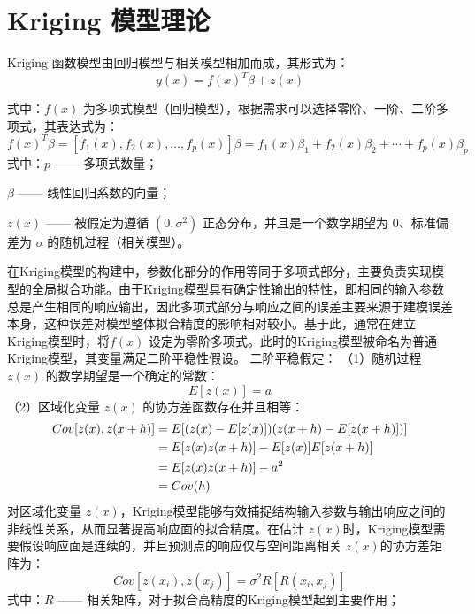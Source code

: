 \section{Kriging 模型理论}
Kriging 函数模型由回归模型与相关模型相加而成，其形式为\cite{JTKJ201904016}：
\begin{equation}
    y(x) = f(x)^T \beta + z(x)
    \label{eq:2.1}
\end{equation}

式中：\( f(x) \) 为多项式模型（回归模型），根据需求可以选择零阶、一阶、二阶多项式，其表达式为：
\begin{equation}
    f(x)^T \beta = [f_1(x), f_2(x), \ldots, f_p(x)] \beta = f_1(x) \beta_1 + f_2(x) \beta_2 + \cdots + f_p(x) \beta_p
    \label{eq:2.2}
\end{equation}
式中：\( p \) —— 多项式数量；

\quad\( \beta \) —— 线性回归系数的向量；

\quad\( z(x) \) —— 被假定为遵循 \( (0, \sigma^2) \) 正态分布，并且是一个数学期望为 0、标准偏差为 \( \sigma \) 的随机过程（相关模型）。

在Kriging模型的构建中，参数化部分的作用等同于多项式部分，主要负责实现模型的全局拟合功能。由于Kriging模型具有确定性输出的特性，即相同的输入参数总是产生相同的响应输出，因此多项式部分与响应之间的误差主要来源于建模误差本身，这种误差对模型整体拟合精度的影响相对较小。基于此，通常在建立Kriging模型时，将\( f(x) \) 设定为零阶多项式。此时的Kriging模型被命名为普通Kriging模型，其变量满足二阶平稳性假设。
二阶平稳假定：
（1）随机过程 \( z(x) \) 的数学期望是一个确定的常数：
\begin{equation}
    E[z(x)] = a
    \label{eq:2.3}
\end{equation}
（2）区域化变量 \( z(x) \) 的协方差函数存在并且相等：
\begin{align}
    Cov[z(x), z(x+h)] &= E[(z(x) - E[z(x)])(z(x+h) - E[z(x+h)])] \notag \\
    &= E[z(x)z(x+h)] - E[z(x)]E[z(x+h)] \notag \\
    &= E[z(x)z(x+h)] - a^2 \notag \\
    &= Cov(h)
    \label{eq:2.4}
\end{align}
对区域化变量 \( z(x) \)，Kriging模型能够有效捕捉结构输入参数与输出响应之间的非线性关系，从而显著提高响应面的拟合精度。在估计 \( z(x) \)时，Kriging模型需要假设响应面是连续的，并且预测点的响应仅与空间距离相关 \( z(x) \)的协方差矩阵为：
\begin{equation}
    Cov[z(x_i), z(x_j)] = \sigma^2 R[R(x_i, x_j)]
    \label{eq:2.5}
\end{equation}
式中：\( R \) —— 相关矩阵，对于拟合高精度的Kriging模型起到主要作用； 

